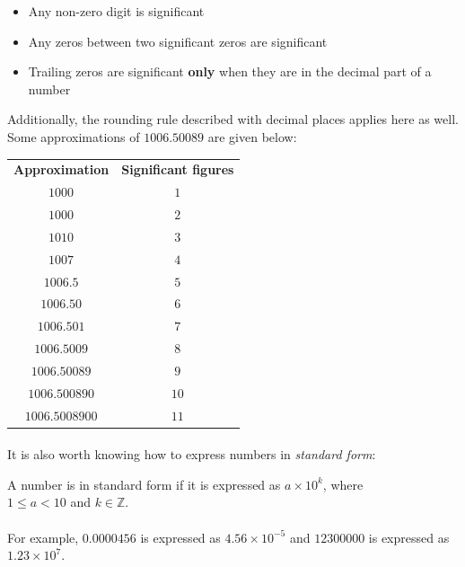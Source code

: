 \documentclass[12pt, a4paper, titlepage, twoside]{article}
\newcommand*{\Z}{\mathbb{Z}}
\begin{document}
	\begin{kp}
		\begin{itemize}
			\item Any non-zero digit is significant
			\item Any zeros between two significant zeros are significant
			\item Trailing zeros are significant \textbf{only} when they are in the decimal part of a number
		\end{itemize}
		
		Additionally, the rounding rule described with decimal places applies here as well. Some approximations of 
		$1006.50089$ are given below:
		
		\begin{longtable}{|c|c|}
			\hline
			\textbf{Approximation} & \textbf{Significant figures}\\
			\hhline{|=|=|}
			$1000$ & $1$\\
			\hline
			$1000$ & $2$\\
			\hline
			$1010$ & $3$\\
			\hline
			$1007$ & $4$\\
			\hline
			$1006.5$ & $5$\\
			\hline
			$1006.50$ & $6$\\
			\hline
			$1006.501$ & $7$\\
			\hline
			$1006.5009$ & $8$\\
			\hline
			$1006.50089$ & $9$\\
			\hline
			$1006.500890$ & $10$\\
			\hline
			$1006.5008900$ & $11$\\
			\hline
		\end{longtable}
	\end{kp}	
	
	\paragraph{}
	It is also worth knowing how to express numbers in \textit{standard form}:\\
	
	\begin{kp}
		A number is in standard form if it is expressed as $a \times 10^k$, where \\ $1 \leq a < 10$ and $k \in \Z$.
	\end{kp}
	
	\paragraph{}
	For example, $0.0000456$ is expressed as $4.56 \times 10^{-5}$ and $12300000$ is expressed as $1.23 \times 10^{7}$.
	
\end{document}
